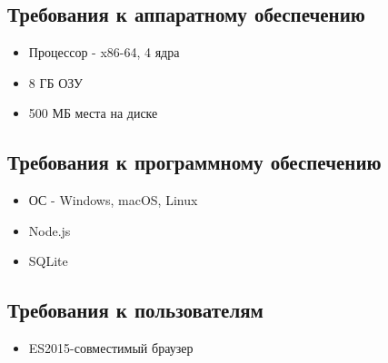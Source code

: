 \documentclass[../document.tex]{subfiles}
\begin{document}
\subsection{Требования к аппаратному обеспечению}
\begin{itemize}
  \item Процессор - x86-64, 4 ядра
  \item 8 ГБ ОЗУ
  \item 500 МБ места на диске
\end{itemize}
\subsection{Требования к программному обеспечению}
\begin{itemize}
  \item ОС - Windows, macOS, Linux
  \item Node.js
  \item SQLite
\end{itemize}
\subsection{Требования к пользователям}
\begin{itemize}
  \item ES2015-совместимый браузер
\end{itemize}
\end{document}
